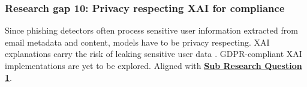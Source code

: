 
\subsubsection*{Research gap 10: Privacy respecting XAI for compliance}\label{research-gap-10}
Since phishing detectors often process sensitive user information extracted from email metadata and content, models have to be privacy respecting. XAI explanations carry the risk of leaking sensitive user data \citep{atlam2022business}. GDPR-compliant XAI implementations are yet to be explored. Aligned with \hyperref[sub-research-q1]{\uline{\textbf{Sub Research Question 1}}}.
